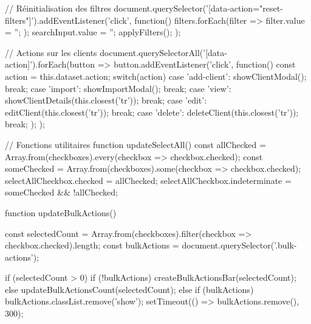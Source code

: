 {    // Réinitialisation des filtres
    document.querySelector('[data-action="reset-filters"]').addEventListener('click', function() {
        filters.forEach(filter => {
            filter.value = '';
        });
        searchInput.value = '';
        applyFilters();
    });

    // Actions sur les clients
    document.querySelectorAll('[data-action]').forEach(button => {
        button.addEventListener('click', function() {
            const action = this.dataset.action;
            switch(action) {
                case 'add-client':
                    showClientModal();
                    break;
                case 'import':
                    showImportModal();
                    break;
                case 'view':
                    showClientDetails(this.closest('tr'));
                    break;
                case 'edit':
                    editClient(this.closest('tr'));
                    break;
                case 'delete':
                    deleteClient(this.closest('tr'));
                    break;
            }
        });
    });

    // Fonctions utilitaires
    function updateSelectAll() {
        const allChecked = Array.from(checkboxes).every(checkbox => checkbox.checked);
        const someChecked = Array.from(checkboxes).some(checkbox => checkbox.checked);
        selectAllCheckbox.checked = allChecked;
        selectAllCheckbox.indeterminate = someChecked && !allChecked;
    }

    function updateBulkActions() {
        const selectedCount = Array.from(checkboxes).filter(checkbox => checkbox.checked).length;
        const bulkActions = document.querySelector('.bulk-actions');
        
        if (selectedCount > 0) {
            if (!bulkActions) {
                createBulkActionsBar(selectedCount);
            } else {
                updateBulkActionsCount(selectedCount);
            }
        } else if (bulkActions) {
            bulkActions.classList.remove('show');
            setTimeout(() => bulkActions.remove(), 300);
        }
    }

}
